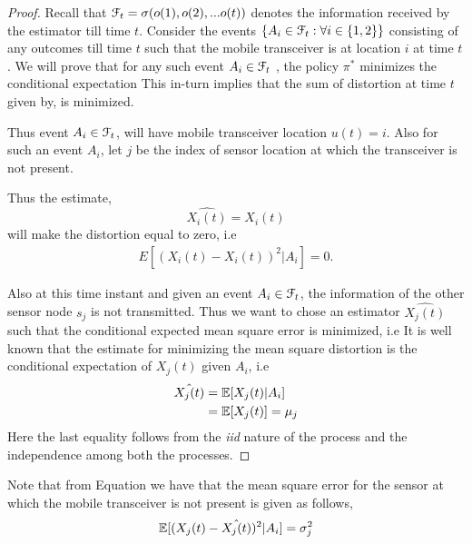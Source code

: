 \documentclass[a4paper,english,12pt]{article}
\begin{document}
\begin{proof}


Recall that  $\mathcal{F}_t=\sigma(o(1),o(2),... o(t))$ denotes the information received by the estimator till time $t$. Consider the events   $\{A_i \in \mathcal{F}_t : \forall i \in \{1,2\}\}$  consisting of any outcomes till time $t$ such that  the  mobile transceiver is at location $i$ at time $t$.
 We will prove that for any such event $A_i \in \mathcal{F}_t$ , the  policy $\pi^*$ minimizes the conditional expectation  This in-turn implies that the sum of distortion at time $t$  given by,  is minimized.

Thus event $A_i \in \mathcal{F}_t$, will have mobile transceiver location $u(t)=i$. Also for such an event $A_i$, let $j$ be the index of sensor location at which the transceiver is not present.

 Thus the estimate, 
 \begin{equation}
 \hat{X_i(t)}= X_i(t) 
 \end{equation}
  will make the distortion equal to zero, i.e \begin{align}\label{mse_0}
  E[(X_i(t)-X_i(t))^2|A_i]=0.
  \end{align}

Also at this time instant  and given an event $A_i \in \mathcal{F}_t$, the information of the other sensor node $s_j$ is not transmitted. Thus we want to chose an estimator $\hat{X_{j}(t)}$ such that the conditional expected mean square error is minimized, i.e
  It is well known that the estimate for minimizing the mean square distortion is the conditional expectation of $X_j(t)$ given $A_i$, i.e 
\begin{align}\label{mse}\hat{X_{j}(t)}&=\mathbb{E}[X_{j}(t)|A_i] \nonumber\\
&=\mathbb{E}[X_{j}(t)]=\mu_j
\end{align}
Here the last equality follows from the \textit{iid} nature of the process and the independence among both the processes.
\end{proof}

Note that from Equation  we have that the mean square error  for the sensor at which the mobile transceiver is not present is given as follows,
\begin{align}\label{mse_2}
\mathbb{E}[(X_{j}(t)-\hat{X_{j}(t)})^2|A_i]=\sigma_j^2
\end{align}
\end{document}
